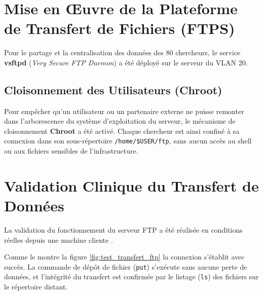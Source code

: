\section{Mise en Œuvre de la Plateforme de Transfert de Fichiers (FTPS)}
Pour le partage et la centralisation des données des 80 chercheurs, le service \textbf{vsftpd} (\textit{Very Secure FTP Daemon}) a été déployé sur le serveur du VLAN 20.


\subsection{Cloisonnement des Utilisateurs (Chroot)}
Pour empêcher qu'un utilisateur ou un partenaire externe ne puisse remonter dans l'arborescence du système d'exploitation du serveur, le mécanisme de cloisonnement \textbf{Chroot} a été activé. Chaque chercheur est ainsi confiné à sa connexion dans son sous-répertoire \texttt{/home/\$USER/ftp}, sans aucun accès au shell ou aux fichiers sensibles de l'infrastructure.

\section{Validation Clinique du Transfert de Données}
La validation du fonctionnement du serveur FTP a été réalisée en conditions réelles depuis une machine cliente . 

Comme le montre la figure \ref{fig:test_transfert_ftp}  la connexion s'établit avec succès. La commande de dépôt de fichier (\texttt{put}) s'exécute sans aucune perte de données, et l'intégrité du transfert est confirmée par le listage (\texttt{ls}) des fichiers sur le répertoire distant.

